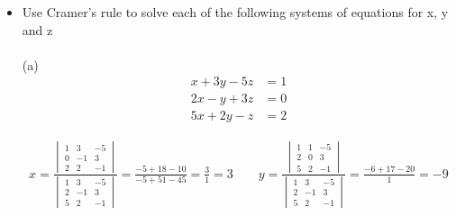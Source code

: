 \documentclass[10pt]{extarticle}
\newcommand{\itembf}[1]{\item[\textbf{#1}]}
\begin{document}
\begin{itemize}
		
		(e)\[\frac{\begin{pmatrix}
				-1&-1&2&-1 \\
				2&-1&-1&-1\\
				-1&2&-1&-1 \\
				-1&-1&-1&2
		\end{pmatrix}}{\begin{vmatrix}
		1&0&1&1 \\
		1&1&0&1\\
		0&1&1&1 \\
		1&1&1&0
	\end{vmatrix}}=\begin{pmatrix}
\frac{1}{3}&\frac{1}{3}&-\frac{2}{3}&\frac{1}{3} \\ \\
-\frac{2}{3}&\frac{1}{3}&\frac{1}{3}&\frac{1}{3}\\ \\
\frac{1}{3}&-\frac{2}{3}&\frac{1}{3}&\frac{1}{3} \\ \\
\frac{1}{3}&\frac{1}{3}&\frac{1}{3}&-\frac{2}{3}
\end{pmatrix}\]




\itembf{6.}
Use Cramer’s rule to solve each of the following systems of equations for x, y and z\\ \\
(a)
\begin{align*}
	x+3y-5z&=1 \\
	2x-y+3z&=0 \\
	5x+2y-z&=2
\end{align*}

	\begin{gather*}
	x=	\frac{\begin{vmatrix}
				1&3&-5\\
				0&-1&3\\
				2&2&-1
		\end{vmatrix}}{	\begin{vmatrix}
			1&3&-5\\
			2&-1&3\\
			5&2&-1
	\end{vmatrix}}=\frac{-5+18-10}{-5+51-45}=\frac{3}{1}=3
	\qquad	y=\frac{	\begin{vmatrix}
					1&1&-5\\
					2&0&3\\
					5&2&-1
			\end{vmatrix}}{	\begin{vmatrix}
				1&3&-5\\
				2&-1&3\\
				5&2&-1
		\end{vmatrix}}=\frac{-6+17-20}{1}=-9
	\end{gather*}



\end{itemize}
\end{document}
